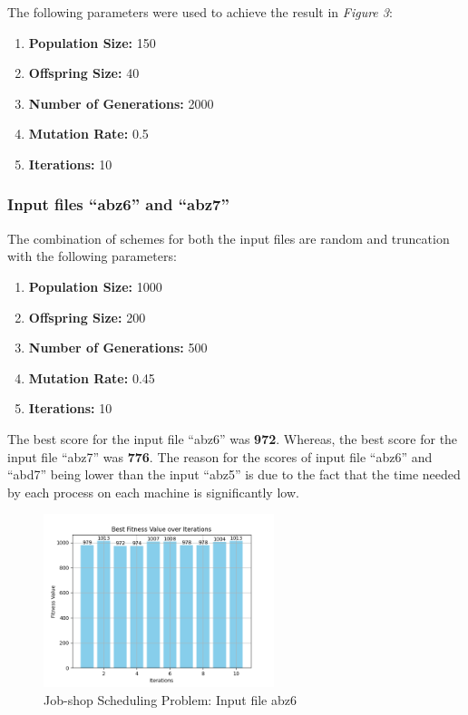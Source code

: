 \documentclass[12pt]{article}
\begin{document}
The following parameters were used to achieve the result in \textit{Figure 3}:

\begin{enumerate}
    \item \textbf{Population Size:} 150
    \item \textbf{Offspring Size:} 40
    \item \textbf{Number of Generations:} 2000
    \item \textbf{Mutation Rate:} 0.5
    \item \textbf{Iterations:} 10
\end{enumerate}

\subsubsection{Input files ``abz6'' and ``abz7''}

The combination of schemes for both the input files are random and truncation with the following parameters:

\begin{enumerate}
    \item \textbf{Population Size:} 1000
    \item \textbf{Offspring Size:} 200
    \item \textbf{Number of Generations:} 500
    \item \textbf{Mutation Rate:} 0.45
    \item \textbf{Iterations:} 10
\end{enumerate}

The best score for the input file ``abz6'' was \textbf{972}. Whereas, the best score for the input file ``abz7'' was \textbf{776}. The reason for the scores of input file ``abz6'' and ``abd7'' being lower than the input ``abz5'' is due to the fact that the time needed by each process on each machine is significantly low. 

\begin{figure}[h]
    \centering
    \includegraphics[width=0.6\textwidth]{images/abz6_rntr1000-200-500-0.45-10.png}
    \caption{Job-shop Scheduling Problem: Input file abz6}
\end{figure}
\end{document}
